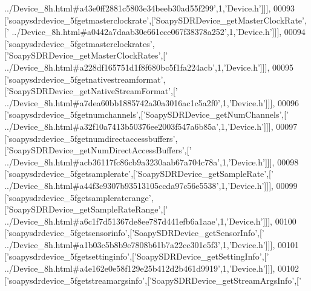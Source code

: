 \begin{DoxyCode}
{      ../Device\_8h.html#a43e0ff2881c5803e34beeb30ad55f299'},1,\textcolor{stringliteral}{'Device.h'}]]],
00093   [\textcolor{stringliteral}{'soapysdrdevice\_5fgetmasterclockrate'},[\textcolor{stringliteral}{'SoapySDRDevice\_getMasterClockRate'},[\textcolor{stringliteral}{'
      ../Device\_8h.html#a0442a7daab30e661cce067f38378a252'},1,\textcolor{stringliteral}{'Device.h'}]]],
00094   [\textcolor{stringliteral}{'soapysdrdevice\_5fgetmasterclockrates'},[\textcolor{stringliteral}{'SoapySDRDevice\_getMasterClockRates'},[\textcolor{stringliteral}{'
      ../Device\_8h.html#a228df165751d1f8f680bc5f1fa224acb'},1,\textcolor{stringliteral}{'Device.h'}]]],
00095   [\textcolor{stringliteral}{'soapysdrdevice\_5fgetnativestreamformat'},[\textcolor{stringliteral}{'SoapySDRDevice\_getNativeStreamFormat'},[\textcolor{stringliteral}{'
      ../Device\_8h.html#a7dea60bb1885742a30a3016ac1c5a2f0'},1,\textcolor{stringliteral}{'Device.h'}]]],
00096   [\textcolor{stringliteral}{'soapysdrdevice\_5fgetnumchannels'},[\textcolor{stringliteral}{'SoapySDRDevice\_getNumChannels'},[\textcolor{stringliteral}{'
      ../Device\_8h.html#a32f10a7413b50376ee2003f547a6b85a'},1,\textcolor{stringliteral}{'Device.h'}]]],
00097   [\textcolor{stringliteral}{'soapysdrdevice\_5fgetnumdirectaccessbuffers'},[\textcolor{stringliteral}{'SoapySDRDevice\_getNumDirectAccessBuffers'},[\textcolor{stringliteral}{'
      ../Device\_8h.html#acb36117fc86cb9a3230aab67a704c78a'},1,\textcolor{stringliteral}{'Device.h'}]]],
00098   [\textcolor{stringliteral}{'soapysdrdevice\_5fgetsamplerate'},[\textcolor{stringliteral}{'SoapySDRDevice\_getSampleRate'},[\textcolor{stringliteral}{'
      ../Device\_8h.html#a44f3c9307b93513105ccda97c56e5538'},1,\textcolor{stringliteral}{'Device.h'}]]],
00099   [\textcolor{stringliteral}{'soapysdrdevice\_5fgetsampleraterange'},[\textcolor{stringliteral}{'SoapySDRDevice\_getSampleRateRange'},[\textcolor{stringliteral}{'
      ../Device\_8h.html#a6c1f7d51367de8ee787d441efb6a1aae'},1,\textcolor{stringliteral}{'Device.h'}]]],
00100   [\textcolor{stringliteral}{'soapysdrdevice\_5fgetsensorinfo'},[\textcolor{stringliteral}{'SoapySDRDevice\_getSensorInfo'},[\textcolor{stringliteral}{'
      ../Device\_8h.html#a1b03c5b8b9e7808b61b7a22cc301e5f3'},1,\textcolor{stringliteral}{'Device.h'}]]],
00101   [\textcolor{stringliteral}{'soapysdrdevice\_5fgetsettinginfo'},[\textcolor{stringliteral}{'SoapySDRDevice\_getSettingInfo'},[\textcolor{stringliteral}{'
      ../Device\_8h.html#a4e162e0e58f129e25b412d2b461d9919'},1,\textcolor{stringliteral}{'Device.h'}]]],
00102   [\textcolor{stringliteral}{'soapysdrdevice\_5fgetstreamargsinfo'},[\textcolor{stringliteral}{'SoapySDRDevice\_getStreamArgsInfo'},[\textcolor{stringliteral}{'
}
\end{DoxyCode}
